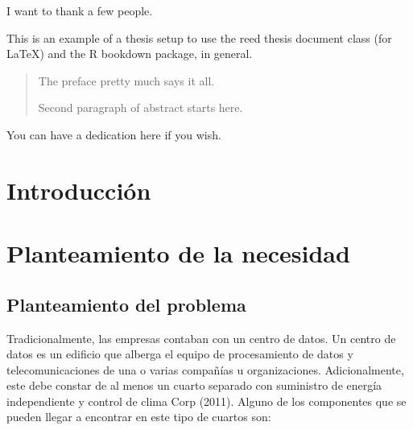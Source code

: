 \documentclass[12pt,twoside]{reedthesis}
\title{}
\author{}
\date{}
\theoremstyle{definition}
\theoremstyle{definition}
\theoremstyle{definition}
\theoremstyle{remark}
\begin{document}

\frontmatter %
\pagestyle{empty} %
  \begin{acknowledgements}
    I want to thank a few people.
  \end{acknowledgements}
  \begin{preface}
    This is an example of a thesis setup to use the reed thesis document
    class (for LaTeX) and the R bookdown package, in general.
  \end{preface}
  \hypersetup{linkcolor=black}
  \setcounter{tocdepth}{2}
  \tableofcontents

  \listoftables

  \listoffigures
  \begin{abstract}
    The preface pretty much says it all.
    
    \par
    
    Second paragraph of abstract starts here.
  \end{abstract}
  \begin{dedication}
    You can have a dedication here if you wish.
  \end{dedication}
\mainmatter %
\pagestyle{fancyplain} %

\hypertarget{introduccion}{%
\chapter*{Introducción}\label{introduccion}}

\hypertarget{rmd-basics}{%
\chapter{Planteamiento de la necesidad}\label{rmd-basics}}

\hypertarget{planteamiento-del-problema}{%
\section{Planteamiento del problema}\label{planteamiento-del-problema}}

Tradicionalmente, las empresas contaban con un centro de datos. Un
centro de datos es un edificio que alberga el equipo de procesamiento de
datos y telecomunicaciones de una o varias compañías u organizaciones.
Adicionalmente, este debe constar de al menos un cuarto separado con
suministro de energía independiente y control de clima Corp (2011).
Alguno de los componentes que se pueden llegar a encontrar en este tipo
de cuartos son:
\end{document}
